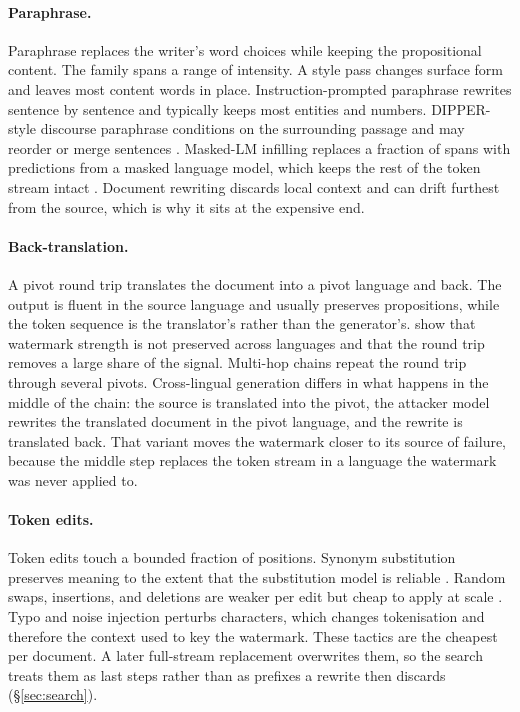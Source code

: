\paragraph{Paraphrase.}
Paraphrase replaces the writer's word choices while keeping the propositional content. The family spans a range of intensity. A style pass changes surface form and leaves most content words in place. Instruction-prompted paraphrase rewrites sentence by sentence and typically keeps most entities and numbers. DIPPER-style discourse paraphrase conditions on the surrounding passage and may reorder or merge sentences \citep{dipper}. Masked-LM infilling replaces a fraction of spans with predictions from a masked language model, which keeps the rest of the token stream intact \citep{sira}. Document rewriting discards local context and can drift furthest from the source, which is why it sits at the expensive end.

\paragraph{Back-translation.}
A pivot round trip translates the document into a pivot language and back. The output is fluent in the source language and usually preserves propositions, while the token sequence is the translator's rather than the generator's. \citet{cwra} show that watermark strength is not preserved across languages and that the round trip removes a large share of the signal. Multi-hop chains repeat the round trip through several pivots. Cross-lingual generation differs in what happens in the middle of the chain: the source is translated into the pivot, the attacker model rewrites the translated document in the pivot language, and the rewrite is translated back. That variant moves the watermark closer to its source of failure, because the middle step replaces the token stream in a language the watermark was never applied to.

\paragraph{Token edits.}
Token edits touch a bounded fraction of positions. Synonym substitution preserves meaning to the extent that the substitution model is reliable \citep{threebricks}. Random swaps, insertions, and deletions are weaker per edit but cheap to apply at scale \citep{markmywords}. Typo and noise injection perturbs characters, which changes tokenisation and therefore the context used to key the watermark. These tactics are the cheapest per document. A later full-stream replacement overwrites them, so the search treats them as last steps rather than as prefixes a rewrite then discards (\S\ref{sec:search}).

